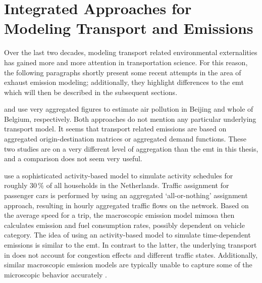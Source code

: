 \section{Integrated Approaches for Modeling Transport and Emissions}
\label{ch:emissions:relatedWork}
%
%
Over the last two decades, modeling transport related environmental 
externalities has gained more and more attention in transportation science.
%
For this reason, the following paragraphs shortly present some recent 
attempts in the area of exhaust emission modeling; additionally, they 
highlight differences to the \gls{emt} which will then be described in the 
subsequent sections.

\citet{CreutzigHe_TransResD_2009} and 
\citet{MichielsEtAl_TransResD_2012} use very 
aggregated figures to estimate air pollution in Beijing and whole of Belgium, 
respectively. Both approaches do not mention any particular underlying 
transport model. It seems that transport related emissions are based on
aggregated origin-destination matrices or aggregated demand functions. These 
two studies are on a very different level of aggregation than the \gls{emt} in 
this thesis, and a comparison does not seem very useful.

\citet{BeckxEtAl_EnvPlannB_2009} use a sophisticated 
activity-based model to simulate activity schedules for roughly 30\,\% of all 
households in the Netherlands. Traffic assignment for passenger cars is 
performed by using an aggregated `all-or-nothing' assignment approach, 
resulting in hourly aggregated traffic flows on the network. Based on the 
average speed for a trip, the macroscopic emission model \acrshort{mimosa} then 
calculates emission and fuel consumption rates, possibly dependent on vehicle 
category. The idea of using an activity-based model to simulate 
time-dependent emissions is similar to the \gls{emt}. In contrast to the 
latter, the underlying transport in \citet{BeckxEtAl_EnvPlannB_2009} 
does not account for congestion effects and different traffic states. 
Additionally, similar macroscopic emission models are typically unable to 
capture some of the microscopic behavior accurately 
\citep[see, e.g.,][]{AhnRakha_TransResD_2008}. 

